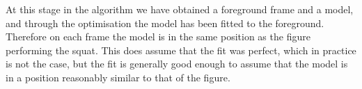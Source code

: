 At this stage in the algorithm we have obtained a foreground frame and a model, and through the optimisation the model has been fitted to the foreground. Therefore on each frame the model is in the same position as the figure performing the squat. This does assume that the fit was perfect, which in practice is not the case, but the fit is generally good enough to assume that the model is in a position reasonably similar to that of the figure.